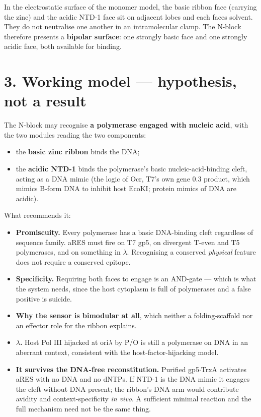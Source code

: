 \documentclass[11pt,a4paper]{article}
\begin{document}
In the electrostatic surface of the monomer model, the basic ribbon face (carrying the zinc) and the
acidic NTD-1 face sit on adjacent lobes and each faces solvent. They do not neutralise one another
in an intramolecular clamp. The N-block therefore presents a \textbf{bipolar surface}: one strongly
basic face and one strongly acidic face, both available for binding.

\section*{3. Working model --- hypothesis, not a result}

The N-block may recognise \textbf{a polymerase engaged with nucleic acid}, with the two modules
reading the two components:

\begin{itemize}[leftmargin=1.4em,itemsep=2pt]
  \item the \textbf{basic zinc ribbon} binds the DNA;
  \item the \textbf{acidic NTD-1} binds the polymerase's basic nucleic-acid-binding cleft, acting as
        a DNA mimic (the logic of Ocr, T7's own gene 0.3 product, which mimics B-form DNA to inhibit
        host EcoKI; protein mimics of DNA are acidic).
\end{itemize}

What recommends it:

\begin{itemize}[leftmargin=1.4em,itemsep=2pt]
  \item \textbf{Promiscuity.} Every polymerase has a basic DNA-binding cleft regardless of sequence
        family. aRES must fire on T7 gp5, on divergent T-even and T5 polymerases, and on something in
        $\lambda$. Recognising a conserved \emph{physical} feature does not require a conserved epitope.
  \item \textbf{Specificity.} Requiring both faces to engage is an AND-gate --- which is what the
        system needs, since the host cytoplasm is full of polymerases and a false positive is suicide.
  \item \textbf{Why the sensor is bimodular at all}, which neither a folding-scaffold nor an
        effector role for the ribbon explains.
  \item \textbf{$\lambda$.} Host Pol III hijacked at ori$\lambda$ by P/O is still a polymerase on DNA
        in an aberrant context, consistent with the host-factor-hijacking model.
  \item \textbf{It survives the DNA-free reconstitution.} Purified gp5$\cdot$TrxA activates aRES with
        no DNA and no dNTPs. If NTD-1 is the DNA mimic it engages the cleft without DNA present; the
        ribbon's DNA arm would contribute avidity and context-specificity \emph{in vivo}. A sufficient
        minimal reaction and the full mechanism need not be the same thing.
\end{itemize}
\end{document}
